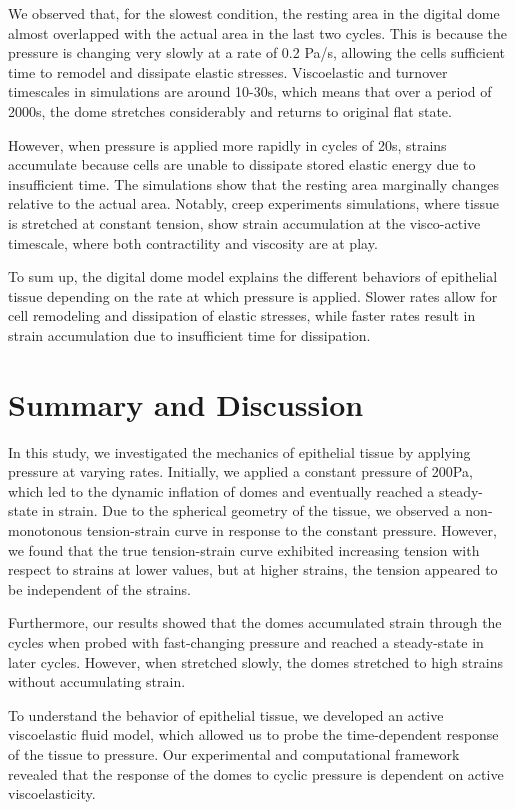 We observed that, for the slowest condition, the resting area in the
digital dome almost overlapped with the actual area in the last two
cycles. This is because the pressure is changing very slowly at a rate
of 0.2 Pa/s, allowing the cells sufficient time to remodel and dissipate
elastic stresses. Viscoelastic and turnover timescales in simulations
are around 10-30s, which means that over a period of 2000s, the dome
stretches considerably and returns to original flat state.

However, when pressure is applied more rapidly in cycles of 20s, strains
accumulate because cells are unable to dissipate stored elastic energy
due to insufficient time. The simulations show that the resting area
marginally changes relative to the actual area. Notably, creep
experiments simulations, where tissue is stretched at constant tension,
show strain accumulation at the visco-active timescale, where both
contractility and viscosity are at play.

To sum up, the digital dome model explains the different behaviors of
epithelial tissue depending on the rate at which pressure is applied.
Slower rates allow for cell remodeling and dissipation of elastic
stresses, while faster rates result in strain accumulation due to
insufficient time for dissipation.

\hypertarget{summary}{%
	\section{Summary and Discussion}\label{summary}}

In this study, we investigated the mechanics of epithelial tissue by
applying pressure at varying rates. Initially, we applied a constant
pressure of 200Pa, which led to the dynamic inflation of domes and
eventually reached a steady-state in strain. Due to the spherical
geometry of the tissue, we observed a non-monotonous tension-strain
curve in response to the constant pressure. However, we found that the
true tension-strain curve exhibited increasing tension with respect to
strains at lower values, but at higher strains, the tension appeared to
be independent of the strains.

Furthermore, our results showed that the domes accumulated strain
through the cycles when probed with fast-changing pressure and reached a
steady-state in later cycles. However, when stretched slowly, the domes
stretched to high strains without accumulating strain.

To understand the behavior of epithelial tissue, we developed an active
viscoelastic fluid model, which allowed us to probe the time-dependent
response of the tissue to pressure. Our experimental and computational
framework revealed that the response of the domes to cyclic pressure is
dependent on active viscoelasticity.

